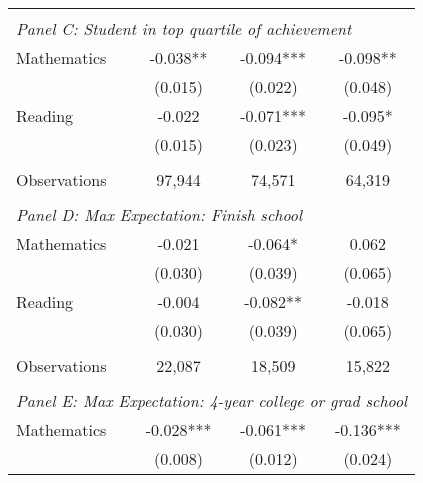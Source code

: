 {\begin{tabular}{lccc}
&  &  &   \\
\multicolumn{4}{l}{\textit{Panel C: Student in top quartile of achievement}} \\
\hspace{3mm}Mathematics&      -0.038** &      -0.094***&      -0.098** \\
                    &     (0.015)   &     (0.022)   &     (0.048)   \\
 
\hspace{3mm}Reading &      -0.022   &      -0.071***&      -0.095*  \\
                    &     (0.015)   &     (0.023)   &     (0.049)   \\
                    &               &               &               \\
\hspace{3mm}Observations&      97,944   &      74,571   &      64,319   \\
 
&  &  &   \\
\multicolumn{4}{l}{\textit{Panel D: Max Expectation: Finish school}} \\
\hspace{3mm}Mathematics&      -0.021   &      -0.064*  &       0.062   \\
                    &     (0.030)   &     (0.039)   &     (0.065)   \\
 
\hspace{3mm}Reading &      -0.004   &      -0.082** &      -0.018   \\
                    &     (0.030)   &     (0.039)   &     (0.065)   \\
                    &               &               &               \\
\hspace{3mm}Observations&      22,087   &      18,509   &      15,822   \\
 
&  &  &   \\
\multicolumn{4}{l}{\textit{Panel E: Max Expectation: 4-year college or grad school}} \\
\hspace{3mm}Mathematics&      -0.028***&      -0.061***&      -0.136***\\
                    &     (0.008)   &     (0.012)   &     (0.024)   \\
 

\end{tabular}}
